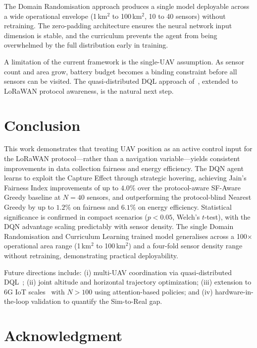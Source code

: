\documentclass[conference]{IEEEtran}
\begin{document}
The Domain Randomisation approach produces a single model deployable across a wide operational envelope (1\,km$^2$ to 100\,km$^2$, 10 to 40 sensors) without retraining. The zero-padding architecture ensures the neural network input dimension is stable, and the curriculum prevents the agent from being overwhelmed by the full distribution early in training.

A limitation of the current framework is the single-UAV assumption. As sensor count and area grow, battery budget becomes a binding constraint before all sensors can be visited. The quasi-distributed DQL approach of~\cite{b6}, extended to LoRaWAN protocol awareness, is the natural next step.

\section{Conclusion}

This work demonstrates that treating UAV position as an active control input for the LoRaWAN protocol---rather than a navigation variable---yields consistent improvements in data collection fairness and energy efficiency. The DQN agent learns to exploit the Capture Effect through strategic hovering, achieving Jain's Fairness Index improvements of up to $4.0\%$ over the protocol-aware SF-Aware Greedy baseline at $N=40$ sensors, and outperforming the protocol-blind Nearest Greedy by up to $1.2\%$ on fairness and $6.1\%$ on energy efficiency. Statistical significance is confirmed in compact scenarios ($p<0.05$, Welch's $t$-test), with the DQN advantage scaling predictably with sensor density. The single Domain Randomisation and Curriculum Learning trained model generalises across a 100$\times$ operational area range (1\,km$^2$ to 100\,km$^2$) and a four-fold sensor density range without retraining, demonstrating practical deployability.

Future directions include: (i) multi-UAV coordination via quasi-distributed DQL~\cite{b6}; (ii) joint altitude and horizontal trajectory optimization; (iii) extension to 6G IoT scales~\cite{b5} with $N > 100$ using attention-based policies; and (iv) hardware-in-the-loop validation to quantify the Sim-to-Real gap.

\section*{Acknowledgment}
\end{document}
